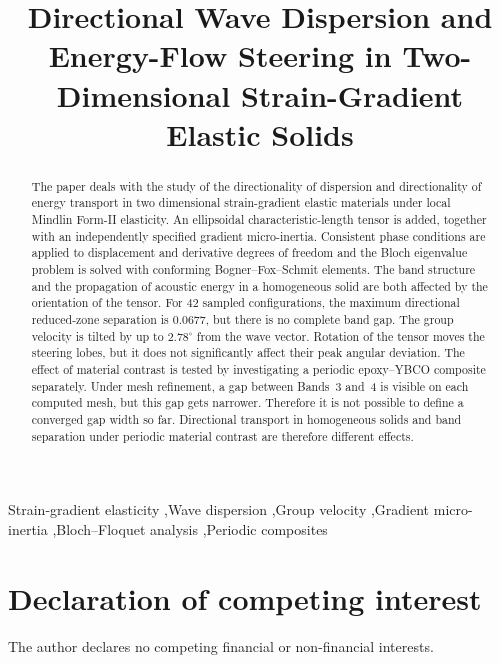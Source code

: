\documentclass[a4paper,preprint,12pt,numbers]{elsarticle}
\begin{document}
\begin{frontmatter}
\title{Directional Wave Dispersion and Energy-Flow Steering in Two-Dimensional Strain-Gradient Elastic Solids}

\begin{abstract}
The paper deals with the study of the directionality of dispersion and directionality of energy transport in two dimensional strain-gradient elastic materials under local Mindlin Form-II elasticity. An ellipsoidal characteristic-length tensor is added, together with an independently specified gradient micro-inertia. Consistent phase conditions are applied to displacement and derivative degrees of freedom and the Bloch eigenvalue problem is solved with conforming Bogner--Fox--Schmit elements. The band structure and the propagation of acoustic energy in a homogeneous solid are both affected by the orientation of the tensor. For 42 sampled configurations, the maximum directional reduced-zone separation is 0.0677, but there is no complete band gap. The group velocity is tilted by up to $2.78^\circ$ from the wave vector. Rotation of the tensor moves the steering lobes, but it does not significantly affect their peak angular deviation. The effect of material contrast is tested by investigating a periodic epoxy--YBCO composite separately. Under mesh refinement, a gap between Bands~3 and~4 is visible on each computed mesh, but this gap gets narrower. Therefore it is not possible to define a converged gap width so far. Directional transport in homogeneous solids and band separation under periodic material contrast are therefore different effects.
\end{abstract}


\begin{keyword}
Strain-gradient elasticity \sep Wave dispersion \sep Group velocity \sep Gradient micro-inertia \sep Bloch--Floquet analysis \sep Periodic composites
\end{keyword}
\end{frontmatter}
\let\cite\citep









\section*{Declaration of competing interest}
The author declares no competing financial or non-financial interests.
\appendix
\renewcommand{\thesection}{\Alph{section}}





\end{document}
